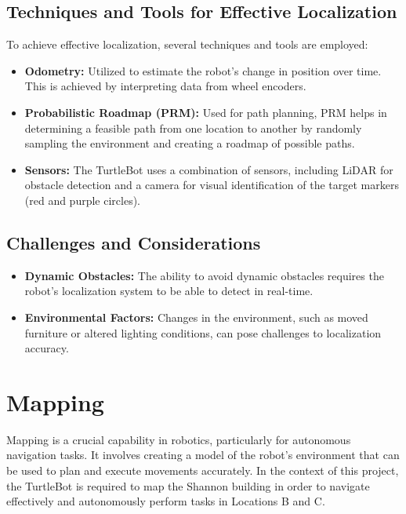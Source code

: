 \documentclass{article}
\begin{document}
	\subsection{Techniques and Tools for Effective Localization}
	To achieve effective localization, several techniques and tools are employed:
	\begin{itemize}
		\item \textbf{Odometry:} Utilized to estimate the robot's change in position over time. This is achieved by interpreting data from wheel encoders.
		\item \textbf{Probabilistic Roadmap (PRM):} Used for path planning, PRM helps in determining a feasible path from one location to another by randomly sampling the environment and creating a roadmap of possible paths.
		\item \textbf{Sensors:} The TurtleBot uses a combination of sensors, including LiDAR for obstacle detection and a camera for visual identification of the target markers (red and purple circles).
	\end{itemize}
	\subsection{Challenges and Considerations}
	\begin{itemize}
		\item \textbf{Dynamic Obstacles:} The ability to avoid dynamic obstacles requires the robot's localization system to be able to detect in real-time.
		\item \textbf{Environmental Factors:} Changes in the environment, such as moved furniture or altered lighting conditions, can pose challenges to localization accuracy.
	\end{itemize}
	\clearpage
	\section{Mapping}
	Mapping is a crucial capability in robotics, particularly for autonomous navigation tasks. It involves creating a model of the robot's environment that can be used to plan and execute movements accurately. In the context of this project, the TurtleBot is required to map the Shannon building in order to navigate effectively and autonomously perform tasks in Locations B and C.
	
\end{document}
